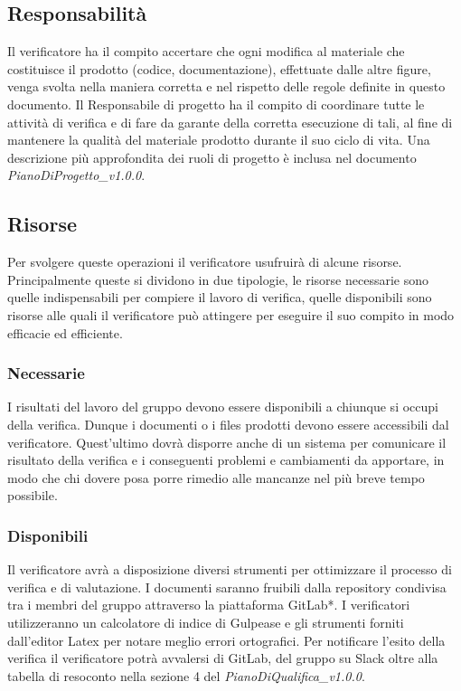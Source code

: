 \subsection{Responsabilità}
Il verificatore ha il compito accertare che ogni modifica al materiale che costituisce il prodotto (codice, documentazione), effettuate dalle altre figure, venga svolta nella maniera corretta e nel rispetto delle regole definite in questo documento. Il Responsabile di progetto ha il compito di coordinare tutte le attività di verifica e di fare da garante della corretta esecuzione di tali, al fine di mantenere la qualità del materiale prodotto durante il suo ciclo di vita. Una descrizione più approfondita dei ruoli di progetto è inclusa nel documento  \textit{PianoDiProgetto\_v1.0.0}.

\subsection{Risorse}
Per svolgere queste operazioni il verificatore usufruirà di alcune risorse. Principalmente queste si dividono in due tipologie, le risorse necessarie sono quelle indispensabili per compiere il lavoro di verifica, quelle disponibili sono risorse alle quali il verificatore può attingere per eseguire il suo compito in modo efficacie ed efficiente.

\subsubsection{Necessarie}
I risultati del lavoro del gruppo devono essere disponibili a chiunque si occupi della verifica. Dunque i documenti o i files prodotti devono essere accessibili dal verificatore. Quest'ultimo dovrà disporre anche di un sistema per comunicare il risultato della verifica e i conseguenti problemi e cambiamenti da apportare, in modo che chi dovere posa porre rimedio alle mancanze nel più breve tempo possibile.

\subsubsection{Disponibili}
Il verificatore avrà a disposizione diversi strumenti per ottimizzare il processo di verifica e di valutazione. I documenti saranno fruibili dalla repository condivisa tra i membri del gruppo attraverso la piattaforma GitLab*. I verificatori utilizzeranno un calcolatore di indice di Gulpease e gli strumenti forniti dall'editor Latex per notare meglio errori ortografici. Per notificare l'esito della verifica il verificatore potrà avvalersi di GitLab, del gruppo su Slack oltre alla tabella di resoconto nella sezione 4 del \textit{PianoDiQualifica\_v1.0.0}.

